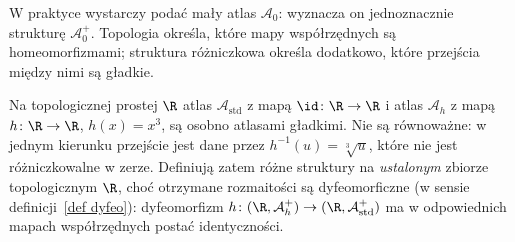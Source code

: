 W praktyce wystarczy podać mały atlas $\mathcal A_0$:
wyznacza on jednoznacznie strukturę $\mathcal A_0^+$.
Topologia określa, które mapy współrzędnych są homeomorfizmami;
struktura różniczkowa określa dodatkowo, które przejścia
między nimi są gładkie.

\begin{przyklad}
Na topologicznej prostej $\R$ atlas $\mathcal A_{\mathrm{std}}$
z mapą $\id\colon\R\to\R$ i atlas $\mathcal A_h$ z mapą
$h\colon\R\to\R$, $h(x)=x^3$, są osobno atlasami gładkimi.
Nie są równoważne: w jednym kierunku
przejście jest dane przez $h^{-1}(u)=\sqrt[3]{u}$,
które nie jest różniczkowalne w zerze.
Definiują zatem różne struktury na \emph{ustalonym} zbiorze
topologicznym $\R$, choć otrzymane rozmaitości są
dyfeomorficzne (w sensie definicji~\ref{def dyfeo}): dyfeomorfizm
$h\colon(\R,\mathcal A_h^+)\to(\R,\mathcal A_{\mathrm{std}}^+)$
ma w odpowiednich mapach współrzędnych postać identyczności.
\end{przyklad}

